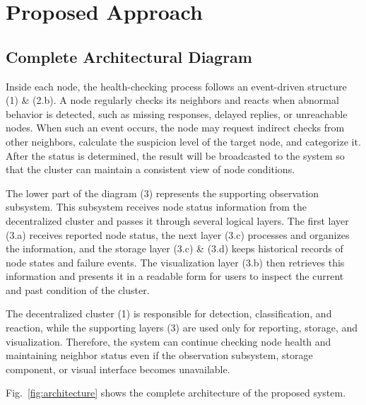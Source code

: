 \section{Proposed Approach} %
\label{sec:proposed_approach}

\subsection{Complete Architectural Diagram}
\label{subsec:architecture}

Inside each node, the health-checking process follows an event-driven structure (1) \& (2.b). A node regularly checks
its neighbors and reacts when abnormal behavior is detected, such as missing responses, delayed replies, or unreachable
nodes. When such an event occurs, the node may request indirect checks from other neighbors, calculate the suspicion
level of the target node, and categorize it. After the status is determined, the result will be broadcasted to the
system so that the cluster can maintain a consistent view of node conditions.

The lower part of the diagram (3) represents the supporting observation subsystem. This subsystem receives node status
information from the decentralized cluster and passes it through several logical layers. The first layer (3.a) receives
reported node status, the next layer (3.c) processes and organizes the information, and the storage layer (3.c) \&
(3.d) keeps historical records of node states and failure events. The visualization layer (3.b) then retrieves this
information and presents it in a readable form for users to inspect the current and past condition of the cluster.

The decentralized cluster (1) is responsible for detection, classification, and reaction, while the supporting layers
(3) are used only for reporting, storage, and visualization. Therefore, the system can continue checking node health
and maintaining neighbor status even if the observation subsystem, storage component, or visual interface becomes
unavailable.

Fig.~\ref{fig:architecture} shows the complete architecture of the proposed system.


